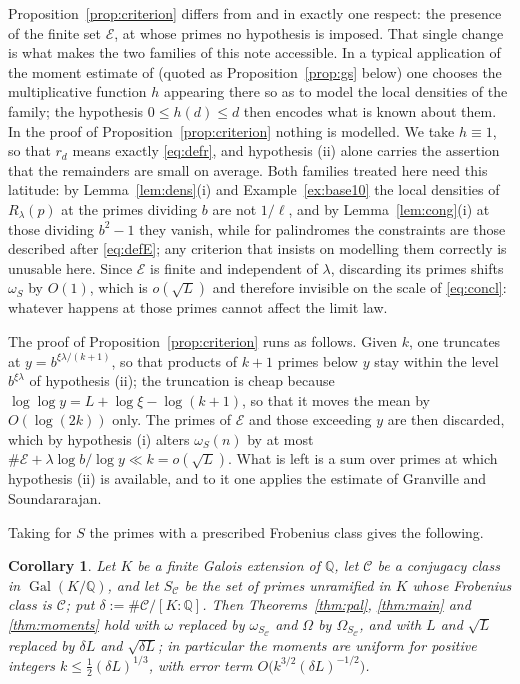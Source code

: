 \documentclass[11pt,a4paper]{article}
\theoremstyle{plain}
\newtheorem{corollary}[theorem]{Corollary}
\theoremstyle{definition}
\DeclareMathOperator{\Gal}{Gal}
\numberwithin{equation}{section}
\begin{document}
Proposition~\ref{prop:criterion} differs from \cite[Prop.~3]{GS} and \cite[Thm.~3]{MMP} in exactly one
respect: the presence of the finite set $\mathcal E$, at whose primes no hypothesis is imposed. That
single change is what makes the two families of this note accessible. In a typical application of the
moment estimate of \cite{GS} (quoted as Proposition~\ref{prop:gs} below) one chooses the multiplicative
function $h$ appearing there so as to model the local densities of the family; the hypothesis
$0\le h(d)\le d$ then encodes what is known about them. In the proof of
Proposition~\ref{prop:criterion} nothing is modelled. We take $h\equiv1$, so that $r_d$ means exactly
\eqref{eq:defr}, and hypothesis (ii) alone carries the assertion that the remainders are small on
average. Both families treated here need this latitude: by Lemma~\ref{lem:dens}(i) and
Example~\ref{ex:base10} the local densities of $R_\lambda(p)$ at the primes dividing $b$ are not
$1/\ell$, and by Lemma~\ref{lem:cong}(i) at those dividing $b^{2}-1$ they vanish, while for palindromes
the constraints are those described after \eqref{eq:defE}; any criterion that insists on modelling them
correctly is unusable here. Since $\mathcal E$ is finite and independent of $\lambda$, discarding its
primes shifts $\omega_S$ by $O(1)$, which is $o(\sqrt L)$ and therefore invisible on the scale of
\eqref{eq:concl}: whatever happens at those primes cannot affect the limit law.

The proof of Proposition~\ref{prop:criterion} runs as follows. Given $k$, one truncates at
$y=b^{\xi\lambda/(k+1)}$, so that products of $k+1$ primes below $y$ stay within the level
$b^{\xi\lambda}$ of hypothesis (ii); the truncation is cheap because
$\log\log y=L+\log\xi-\log(k+1)$, so that it moves the mean by $O(\log(2k))$ only. The primes of
$\mathcal E$ and those exceeding $y$ are then discarded, which by hypothesis (i) alters $\omega_S(n)$ by
at most $\#\mathcal E+\lambda\log b/\log y\ll k=o(\sqrt L)$. What is left is a sum over primes at which
hypothesis (ii) is available, and to it one applies the estimate of Granville and Soundararajan.

Taking for $S$ the primes with a prescribed Frobenius class gives the following.

\begin{corollary}\label{cor:cheb}
Let $K$ be a finite Galois extension of $\mathbb Q$, let $\mathcal C$ be a conjugacy class in
$\Gal(K/\mathbb Q)$, and let $S_{\mathcal C}$ be the set of primes unramified in $K$ whose Frobenius
class is $\mathcal C$; put $\delta:=\#\mathcal C/[K:\mathbb Q]$. Then Theorems~\ref{thm:pal},
\ref{thm:main} and \ref{thm:moments} hold with $\omega$ replaced by $\omega_{S_{\mathcal C}}$ and
$\Omega$ by $\Omega_{S_{\mathcal C}}$, and with $L$ and $\sqrt L$ replaced by $\delta L$ and
$\sqrt{\delta L}$; in particular the moments are uniform for positive integers
$k\le\frac12(\delta L)^{1/3}$, with error term $O\bigl(k^{3/2}(\delta L)^{-1/2}\bigr)$.
\end{corollary}
\end{document}

